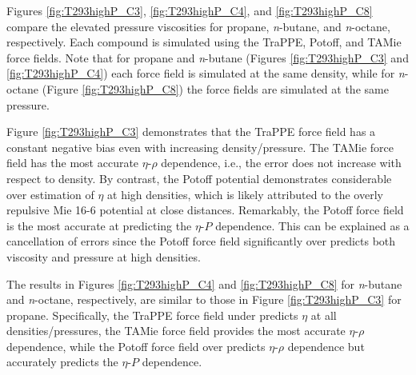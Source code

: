 \documentclass[preprint,review,12pt]{elsarticle}
\begin{document}
	Figures \ref{fig:T293highP_C3}, \ref{fig:T293highP_C4}, and \ref{fig:T293highP_C8} compare the elevated pressure viscosities for propane, \textit{n}-butane, and \textit{n}-octane, respectively. Each compound is simulated using the TraPPE, Potoff, and TAMie force fields. Note that for propane and \textit{n}-butane (Figures \ref{fig:T293highP_C3} and \ref{fig:T293highP_C4}) each force field is simulated at the same density, while for \textit{n}-octane (Figure \ref{fig:T293highP_C8}) the force fields are simulated at the same pressure. 
	
	
	Figure \ref{fig:T293highP_C3} demonstrates that the TraPPE force field has a constant negative bias even with increasing density/pressure. The TAMie force field has the most accurate $\eta$-$\rho$ dependence, i.e., the error does not increase with respect to density. By contrast, the Potoff potential demonstrates considerable over estimation of $\eta$ at high densities, which is likely attributed to the overly repulsive Mie 16-6 potential at close distances. Remarkably, the Potoff force field is the most accurate at predicting the $\eta$-$P$ dependence. This can be explained as a cancellation of errors since the Potoff force field significantly over predicts both viscosity and pressure at high densities. 
	
	The results in Figures \ref{fig:T293highP_C4} and \ref{fig:T293highP_C8} for \textit{n}-butane and \textit{n}-octane, respectively, are similar to those in Figure \ref{fig:T293highP_C3} for propane. Specifically, the TraPPE force field under predicts $\eta$ at all densities/pressures, the TAMie force field provides the most accurate $\eta$-$\rho$ dependence, while the Potoff force field over predicts $\eta$-$\rho$ dependence but accurately predicts the $\eta$-$P$ dependence.  
	
\end{document}
